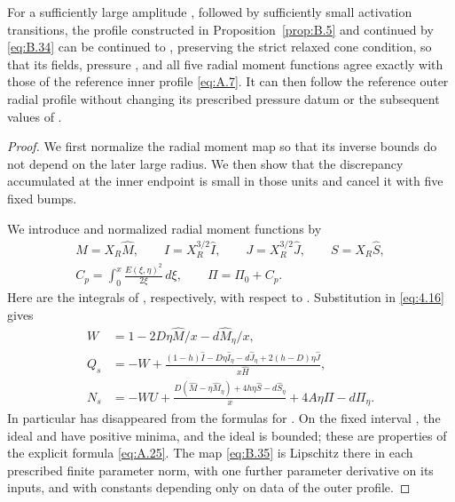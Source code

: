 \begin{proposition}\label{prop:B.8}
For a sufficiently large amplitude , followed by sufficiently small activation transitions,
the profile constructed in Proposition~\ref{prop:B.5} and continued by \eqref{eq:B.34} can be continued to
, preserving the strict relaxed cone condition, so that its fields, pressure
, and all five radial moment functions
 agree exactly with those of the reference inner profile \eqref{eq:A.7}. It
can then follow the reference outer radial profile without changing its prescribed pressure datum or
the subsequent values of .
\end{proposition}
\begin{proof}
We first normalize the radial moment map so that its inverse bounds do not depend
on the later large radius. We then show that the discrepancy accumulated at the inner
endpoint is small in those units and cancel it with five fixed bumps.

We introduce  and normalized radial moment functions by
\[
\begin{gathered}
  M=X_R\widehat M,\qquad
  I=X_R^{3/2}\widehat I,\qquad
  J=X_R^{3/2}\widehat J,\qquad
  S=X_R\widehat S,\\
  C_p=\displaystyle\int_0^x\frac{E(\xi,\eta)^2}{2\xi}\,d\xi,
  \qquad
  \Pi=\Pi_0+C_p.
\end{gathered}
\]
Here  are the integrals of
, respectively, with respect to
. Substitution in \eqref{eq:4.16} gives
\begin{equation}
\begin{aligned}
  W&=1-2D\eta\widehat M/x-d\widehat M_\eta/x,\\
  Q_s&=-W+\frac{(1-h)\widehat I-D\eta\widehat I_\eta-d\widehat J_\eta
                   +2(h-D)\eta\widehat J}{x\widehat H},\\
  N_s&=-WU+\frac{D(\widehat M-\eta\widehat M_\eta)+4h\eta\widehat S-d\widehat S_\eta}{x}
                   +4A\eta\Pi-d\Pi_\eta.
\end{aligned}
\tag{B.35}\label{eq:B.35}
\end{equation}
%
In particular  has disappeared from the formulas for
. On the fixed interval
, the ideal
 and  have positive minima, and the ideal
 is bounded; these are properties of the explicit formula \eqref{eq:A.25}. The map \eqref{eq:B.35} is Lipschitz
there in each prescribed finite parameter norm, with one further parameter derivative on its
inputs, and with constants depending only on data of the outer profile.


\end{proof}
